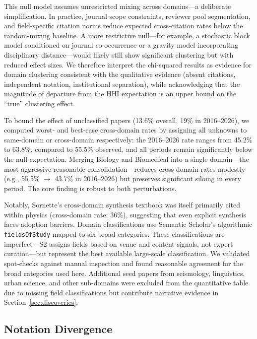 \documentclass[11pt]{article}
\begin{document}
This null model assumes unrestricted mixing across domains---a deliberate simplification. In practice, journal scope constraints, reviewer pool segmentation, and field-specific citation norms reduce expected cross-citation rates below the random-mixing baseline. A more restrictive null---for example, a stochastic block model conditioned on journal co-occurrence or a gravity model incorporating disciplinary distance---would likely still show significant clustering but with reduced effect sizes. We therefore interpret the chi-squared results as evidence for domain clustering consistent with the qualitative evidence (absent citations, independent notation, institutional separation), while acknowledging that the magnitude of departure from the HHI expectation is an upper bound on the ``true'' clustering effect.

To bound the effect of unclassified papers (13.6\% overall, 19\% in 2016--2026), we computed worst- and best-case cross-domain rates by assigning all unknowns to same-domain or cross-domain respectively: the 2016--2026 rate ranges from 45.2\% to 63.8\%, compared to 55.5\% observed, and all periods remain significantly below the null expectation. Merging Biology and Biomedical into a single domain---the most aggressive reasonable consolidation---reduces cross-domain rates modestly (e.g., 55.5\% $\to$ 43.7\% in 2016--2026) but preserves significant siloing in every period. The core finding is robust to both perturbations.

Notably, Sornette's cross-domain synthesis textbook \citep{sornette2004} was itself primarily cited within physics (cross-domain rate: 36\%), suggesting that even explicit synthesis faces adoption barriers. Domain classifications use Semantic Scholar's algorithmic \texttt{fieldsOfStudy} mapped to six broad categories. These classifications are imperfect---S2 assigns fields based on venue and content signals, not expert curation---but represent the best available large-scale classification. We validated spot-checks against manual inspection and found reasonable agreement for the broad categories used here. Additional seed papers from seismology, linguistics, urban science, and other sub-domains were excluded from the quantitative table due to missing field classifications but contribute narrative evidence in Section~\ref{sec:discoveries}.

\subsection{Notation Divergence}
\end{document}

